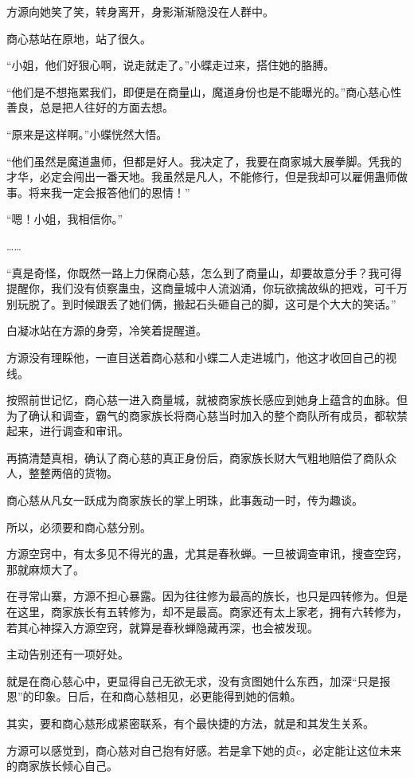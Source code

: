 \begin{this_body}
方源向她笑了笑，转身离开，身影渐渐隐没在人群中。

商心慈站在原地，站了很久。

“小姐，他们好狠心啊，说走就走了。”小蝶走过来，搭住她的胳膊。

“他们是不想拖累我们，即便是在商量山，魔道身份也是不能曝光的。”商心慈心性善良，总是把人往好的方面去想。

“原来是这样啊。”小蝶恍然大悟。

“他们虽然是魔道蛊师，但都是好人。我决定了，我要在商家城大展拳脚。凭我的才华，必定会闯出一番天地。我虽然是凡人，不能修行，但是我却可以雇佣蛊师做事。将来我一定会报答他们的恩情！”

“嗯！小姐，我相信你。”

……

“真是奇怪，你既然一路上力保商心慈，怎么到了商量山，却要故意分手？我可得提醒你，我们没有侦察蛊虫，这商量城中人流汹涌，你玩欲擒故纵的把戏，可千万别玩脱了。到时候跟丢了她们俩，搬起石头砸自己的脚，这可是个大大的笑话。”

白凝冰站在方源的身旁，冷笑着提醒道。

方源没有理睬他，一直目送着商心慈和小蝶二人走进城门，他这才收回自己的视线。

按照前世记忆，商心慈一进入商量城，就被商家族长感应到她身上蕴含的血脉。但为了确认和调查，霸气的商家族长将商心慈当时加入的整个商队所有成员，都软禁起来，进行调查和审讯。

再搞清楚真相，确认了商心慈的真正身份后，商家族长财大气粗地赔偿了商队众人，整整两倍的货物。

商心慈从凡女一跃成为商家族长的掌上明珠，此事轰动一时，传为趣谈。

所以，必须要和商心慈分别。

方源空窍中，有太多见不得光的蛊，尤其是春秋蝉。一旦被调查审讯，搜查空窍，那就麻烦大了。

在寻常山寨，方源不担心暴露。因为往往修为最高的族长，也只是四转修为。但是在这里，商家族长有五转修为，却不是最高。商家还有太上家老，拥有六转修为，若其心神探入方源空窍，就算是春秋蝉隐藏再深，也会被发现。

主动告别还有一项好处。

就是在商心慈心中，更显得自己无欲无求，没有贪图她什么东西，加深“只是报恩”的印象。日后，在和商心慈相见，必更能得到她的信赖。

其实，要和商心慈形成紧密联系，有个最快捷的方法，就是和其发生关系。

方源可以感觉到，商心慈对自己抱有好感。若是拿下她的贞c，必定能让这位未来的商家族长倾心自己。


\end{this_body}
